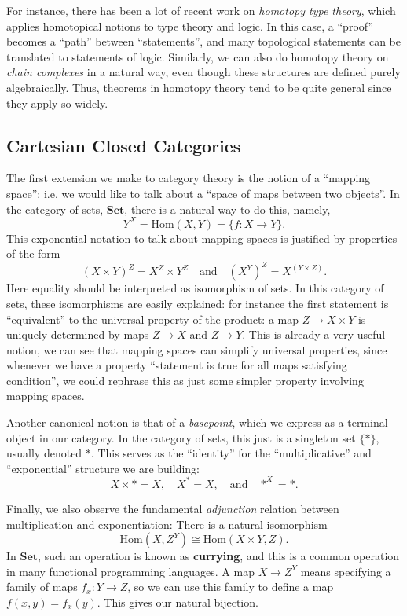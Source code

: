 \documentclass{article}
\providecommand{\Hom}{\mathrm{Hom}}
\begin{document}
For instance, there has been a lot of recent work on \emph{homotopy type theory}, which applies homotopical notions to type theory and logic. In this case, a ``proof'' becomes a ``path'' between ``statements'', and many topological statements can be translated to statements of logic. Similarly, we can also do homotopy theory on \emph{chain complexes} in a natural way, even though these structures are defined purely algebraically. Thus, theorems in homotopy theory tend to be quite general since they apply so widely.

\subsection{Cartesian Closed Categories}

The first extension we make to category theory is the notion of a ``mapping space''; i.e. we would like to talk about a ``space of maps between two objects''. In the category of sets, $\mathbf{Set}$, there is a natural way to do this, namely,
\[ Y^X = \Hom(X, Y) = \{ f : X \to Y \}.\]
This exponential notation to talk about mapping spaces is justified by properties of the form
\[(X\times Y)^Z = X^Z\times Y^Z\quad\textrm{and}\quad (X^Y)^Z = X^{(Y\times Z)}.\]
Here equality should be interpreted as isomorphism of sets. In this category of sets, these isomorphisms are easily explained: for instance the first statement is ``equivalent'' to the universal property of the product: a map $Z \to X\times Y$ is uniquely determined by maps $Z \to X$ and $Z\to Y$. This is already a very useful notion, we can see that mapping spaces can simplify universal properties, since whenever we have a property ``statement is true for all maps satisfying condition'', we could rephrase this as just some simpler property involving mapping spaces.

Another canonical notion is that of a \emph{basepoint}, which we express as a terminal object in our category. In the category of sets, this just is a singleton set $\{*\}$, usually denoted $*$. This serves as the ``identity'' for the ``multiplicative'' and ``exponential'' structure we are building:
\[X \times * = X, \quad X^* = X,\quad\textrm{and}\quad *^X = *.\]

Finally, we also observe the fundamental \emph{adjunction} relation between multiplication and exponentiation: There is a natural isomorphism
\[
  \Hom(X, Z^Y) \cong \Hom(X\times Y, Z).
\]
In $\mathbf{Set}$, such an operation is known as \textbf{currying}, and this is a common operation in many functional programming languages. A map $X \to Z^Y$ means specifying a family of maps $f_x : Y \to Z$, so we can use this family to define a map $f(x,y)=f_x(y)$. This gives our natural bijection.
\end{document}
